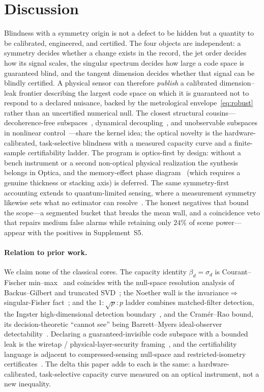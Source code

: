 \documentclass[10pt,twocolumn]{article}
\theoremstyle{plain}
\theoremstyle{definition}
\newcommand{\bd}{\beta}
\begin{document}
\section{Discussion}
Blindness with a symmetry origin is not a defect to be hidden but a quantity to be
calibrated, engineered, and certified. The four objects are independent: a symmetry
decides whether a change exists in the record, the jet order decides how its signal
scales, the singular spectrum decides how large a code space is guaranteed blind,
and the tangent dimension decides whether that signal can be blindly certified. A
physical sensor can therefore \emph{publish} a calibrated dimension--leak frontier
describing the largest code space on which it is guaranteed not to respond to a
declared nuisance, backed by the metrological envelope~\eqref{eq:robust} rather than
an uncertified numerical null. The closest structural cousins---decoherence-free
subspaces~\cite{ZanardiRasetti,LidarChuangWhaley}, dynamical
decoupling~\cite{ViolaKnillLloyd}, and unobservable subspaces in nonlinear
control~\cite{HermannKrener}---share the kernel idea; the optical novelty is the
hardware-calibrated, task-selective blindness with a measured capacity curve and a
finite-sample certifiability ladder. The program is optics-first by design: without
a bench instrument or a second non-optical physical realization the synthesis
belongs in Optica, and the memory-effect phase diagram~\cite{FengMemory} (which
requires a genuine thickness or stacking axis) is deferred. The same
symmetry-first accounting extends to quantum-limited sensing, where a measurement
symmetry likewise sets what no estimator can resolve~\cite{Tsang}. The honest negatives that bound the
scope---a segmented bucket that breaks the mean wall, and a coincidence veto that
repairs medium false alarms while retaining only $24\%$ of scene power---appear with
the positives in Supplement~S5.

\paragraph{Relation to prior work.}
We claim none of the classical cores. The capacity identity $\bd_d=\sigma_d$ is
Courant--Fischer min--max~\cite{HornJohnson} and coincides with the null-space
resolution analysis of Backus--Gilbert and truncated SVD~\cite{BackusGilbert}; the
Noether wall is the invariance$\Rightarrow$singular-Fisher fact~\cite{Vaart}; and the
$1:\sqrt{p}:p$ ladder combines matched-filter detection, the Ingster
high-dimensional detection boundary~\cite{IngsterSuslina}, and the Cram\'er--Rao
bound, its decision-theoretic ``cannot see'' being Barrett--Myers ideal-observer
detectability~\cite{BarrettMyers}. Declaring a guaranteed-invisible code subspace
with a bounded leak is the wiretap / physical-layer-security framing~\cite{Wyner},
and the certifiability language is adjacent to compressed-sensing null-space and
restricted-isometry certificates~\cite{CandesTao}. The delta this paper adds to each
is the same: a hardware-calibrated, task-selective capacity curve measured on an
optical instrument, not a new inequality.
\end{document}
